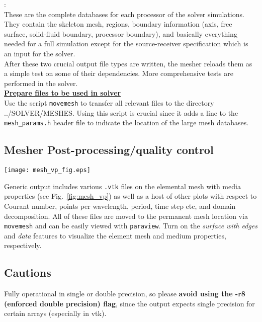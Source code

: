 \documentclass[11pt,letter,fleqn,english,notitlepage]{article}
\begin{document}
: \\
These are the complete databases for each processor of the 
solver simulations. They contain the skeleton mesh, regions, boundary 
information (axis, free surface, solid-fluid boundary, processor boundary), 
and basically everything needed for a full simulation except for the 
source-receiver specification which is an input for the solver. \\

\noindent After these two crucial output file types are written, the mesher reloads them as a
simple test on some of their dependencies. More comprehensive tests are 
performed in the solver. \\

\noindent\textbf{\underline{Prepare files to be used in solver}}\\
Use the script {\tt movemesh} to transfer all relevant files to the directory ../SOLVER/MESHES. 
Using this script is crucial since it adds 
a line to the {\tt mesh\_params.h} header file to indicate the location of the large mesh 
databases.

\subsection{Mesher Post-processing/quality control }
\begin{figure*}[htb]
\begin{center}\label{fig:mesh_vp}
\texttt{[image: mesh\_vp\_fig.eps]}
\caption{\textit{The elemental mesh (blue lines) for IASP91 at 20 seconds superimposed on the $v_p$ velocity. 
The plot is derived straight from the file {\tt mesh\_vp.vtk} produced by the mesher. Zoom sections of the 
central region and crust/upper mantle are added to highlight the topological features.}}
\end{center}
\end{figure*}
%
\noindent Generic output includes various {\tt *.vtk} files on the elemental mesh with media properties 
(see Fig.~\ref{fig:mesh_vp}) as well as a host of other plots with respect to Courant number, 
points per wavelength, period, time step etc, and domain decomposition.
All of these files are moved to the permanent mesh location via {\tt movemesh} and can be easily viewed with {\tt paraview}. 
Turn on the \textit{surface with edges} and \textit{data} features to visualize the element mesh and medium 
properties, respectively.

\subsection{Cautions}
Fully operational in single or double precision, so please 
\textbf{avoid using the -r8 (enforced double precision) flag}, 
since the output expects single precision for certain arrays (especially in vtk).
\end{document}
